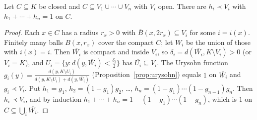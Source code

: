 \begin{lemma}\label{lem:pou}
Let $C\subseteq K$ be closed and $C\subseteq V_1\cup\cdots\cup V_n$ with $V_i$ open. There are $h_i\prec V_i$ with $h_1+\cdots+h_n=1$ on $C$.
\end{lemma}
\begin{proof}
Each $x\in C$ has a radius $r_x>0$ with $\overline B(x,2r_x)\subseteq V_i$ for some $i=i(x)$. Finitely many balls $B(x,r_x)$ cover the compact $C$; let $W_i$ be the union of those with $i(x)=i$. Then $\overline{W_i}$ is compact and inside
$V_i$, so $\delta_i=d(\overline{W_i},K\setminus V_i)>0$ (or $V_i=K$), and $U_i=\{y:d(y,\overline{W_i})<\frac{\delta_i}2\}$ has $\overline{U_i}\subseteq V_i$. The Urysohn function $g_i(y)=\frac{d(y,K\setminus U_i)}{d(y,K\setminus U_i)+d(y,\overline{W_i})}$
(Proposition~\ref{prop:urysohn}) equals $1$ on $\overline{W_i}$ and $g_i\prec V_i$. Put $h_1=g_1$, $h_2=(1-g_1)g_2$, \ldots, $h_n=(1-g_1)\cdots(1-g_{n-1})g_n$. Then $h_i\prec V_i$, and by induction
$h_1+\cdots+h_n=1-(1-g_1)\cdots(1-g_n)$, which is $1$ on $C\subseteq\bigcup_i\overline{W_i}$.
\end{proof}

